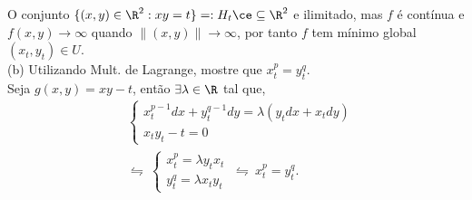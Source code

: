 \textcolor{gris}{O conjunto \(\{(x,y) \in \R^2 : xy=t\}=: H_t\ce\subseteq \R^2 \) e ilimitado, mas \(f\) é contínua e \(f(x,y) \to \infty\) quando \(\|(x,y)\| \to \infty\), por tanto \(f\) tem mínimo global \((x_t, y_t) \in U\). } \\
(b) Utilizando Mult. de Lagrange, mostre que \(x_t^p = y_t^q\). \\ 
\textcolor{gris}{Seja \(g(x,y) = xy - t\), então \(\exists \lambda \in \R \) tal que,  %
\begin{align*} 
    &\begin{cases}
        x_t^{p-1}dx + y_t^{q-1}dy = \lambda (y_t dx + x_tdy) \\ 
        x_ty_t  - t = 0
    \end{cases} \\ 
    &\leftrightharpoons \ 
    \begin{cases}
        x_t^p = \lambda y_tx_t   \\ 
        y_t^q = \lambda x_ty_t   
    \end{cases} \ \leftrightharpoons \ x_t^p = y_t^q. 
\end{align*}
}

\-\vspace{2cm}\\ 
 \lipsum